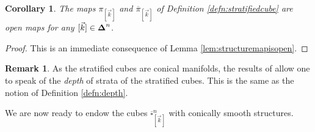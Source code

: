 \documentclass[10pt, reqno, twoside
, final
]{amsart}
\numberwithin{equation}{subsection}%
\theoremstyle{definition}
\theoremstyle{definition}
\theoremstyle{definition}
\theoremstyle{definition}
\theoremstyle{definition}
\theoremstyle{definition}
\theoremstyle{definition}
\theoremstyle{definition}
\theoremstyle{definition}
\theoremstyle{plain}
\theoremstyle{definition}
\theoremstyle{plain}
\theoremstyle{definition}
\theoremstyle{plain}
\newtheorem{cor}[defn]{Corollary}
\theoremstyle{definition}
\newtheorem{rmk}[defn]{Remark}
\theoremstyle{definition}
\theoremstyle{plain}
\theoremstyle{plain}
\theoremstyle{definition}
\theoremstyle{plain}
\theoremstyle{plain}
\theoremstyle{plain}
\begin{document}
\begin{cor}\label{cor:openmap}
The maps $\pi_{[\vec{k}]}$ and $\overline{\pi}_{[\vec{k}]}$ of Definition \ref{defn:stratifiedcube} are open maps for any $[\vec{k}]\in \boldsymbol{\Delta}^n$.   
\end{cor}
\begin{proof}
    This is an immediate consequence of Lemma \ref{lem:structuremapisopen}.
\end{proof}
\begin{rmk}
As the stratified cubes are conical manifolds, the results of \cite[Section 2.4]{AFT-local-structures} allow one to speak of the \emph{depth} of strata of the stratified cubes. This is the same as the notion of Definition \ref{defn:depth}.  
\end{rmk}

We are now ready to endow the cubes $\overline{\square}^n_{[\vec{k}]}$ 
with conically smooth structures. 
\end{document}
